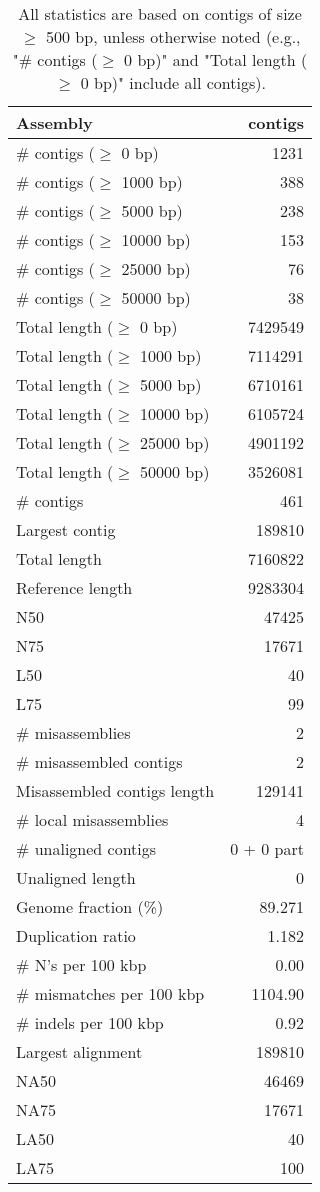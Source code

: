 \documentclass[12pt,a4paper]{article}
\begin{document}
\begin{table}[ht]
\begin{center}
\caption{All statistics are based on contigs of size $\geq$ 500 bp, unless otherwise noted (e.g., "\# contigs ($\geq$ 0 bp)" and "Total length ($\geq$ 0 bp)" include all contigs).}
\begin{tabular}{|l*{1}{|r}|}
\hline
Assembly & contigs \\ \hline
\# contigs ($\geq$ 0 bp) & 1231 \\ \hline
\# contigs ($\geq$ 1000 bp) & 388 \\ \hline
\# contigs ($\geq$ 5000 bp) & 238 \\ \hline
\# contigs ($\geq$ 10000 bp) & 153 \\ \hline
\# contigs ($\geq$ 25000 bp) & 76 \\ \hline
\# contigs ($\geq$ 50000 bp) & 38 \\ \hline
Total length ($\geq$ 0 bp) & 7429549 \\ \hline
Total length ($\geq$ 1000 bp) & 7114291 \\ \hline
Total length ($\geq$ 5000 bp) & 6710161 \\ \hline
Total length ($\geq$ 10000 bp) & 6105724 \\ \hline
Total length ($\geq$ 25000 bp) & 4901192 \\ \hline
Total length ($\geq$ 50000 bp) & 3526081 \\ \hline
\# contigs & 461 \\ \hline
Largest contig & 189810 \\ \hline
Total length & 7160822 \\ \hline
Reference length & 9283304 \\ \hline
N50 & 47425 \\ \hline
N75 & 17671 \\ \hline
L50 & 40 \\ \hline
L75 & 99 \\ \hline
\# misassemblies & 2 \\ \hline
\# misassembled contigs & 2 \\ \hline
Misassembled contigs length & 129141 \\ \hline
\# local misassemblies & 4 \\ \hline
\# unaligned contigs & 0 + 0 part \\ \hline
Unaligned length & 0 \\ \hline
Genome fraction (\%) & 89.271 \\ \hline
Duplication ratio & 1.182 \\ \hline
\# N's per 100 kbp & 0.00 \\ \hline
\# mismatches per 100 kbp & 1104.90 \\ \hline
\# indels per 100 kbp & 0.92 \\ \hline
Largest alignment & 189810 \\ \hline
NA50 & 46469 \\ \hline
NA75 & 17671 \\ \hline
LA50 & 40 \\ \hline
LA75 & 100 \\ \hline
\end{tabular}
\end{center}
\end{table}
\end{document}
